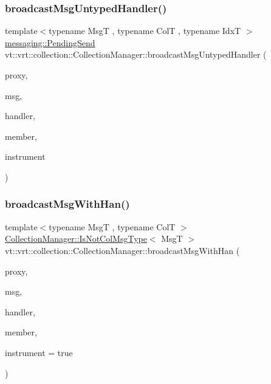 \subsubsection{\texorpdfstring{broadcast\+Msg\+Untyped\+Handler()}{broadcastMsgUntypedHandler()}}
{\footnotesize\ttfamily template$<$typename MsgT , typename ColT , typename IdxT $>$ \\
\hyperlink{structvt_1_1messaging_1_1_pending_send}{messaging\+::\+Pending\+Send} vt\+::vrt\+::collection\+::\+Collection\+Manager\+::broadcast\+Msg\+Untyped\+Handler (\begin{DoxyParamCaption}\item[{\hyperlink{structvt_1_1vrt_1_1collection_1_1_collection_manager_a56458ed7f9bb22b631b9b3a745f42f94}{Collection\+Proxy\+Wrap\+Type}$<$ ColT, IdxT $>$ const \&}]{proxy,  }\item[{MsgT $\ast$}]{msg,  }\item[{\hyperlink{namespacevt_af64846b57dfcaf104da3ef6967917573}{Handler\+Type} const \&}]{handler,  }\item[{bool const}]{member,  }\item[{bool}]{instrument }\end{DoxyParamCaption})}

\mbox{\label{structvt_1_1vrt_1_1collection_1_1_collection_manager_aa4f27486773ea5bec481099223ab12d1}} 
\subsubsection{\texorpdfstring{broadcast\+Msg\+With\+Han()}{broadcastMsgWithHan()}\hspace{0.1cm}{\footnotesize\ttfamily [1/2]}}
{\footnotesize\ttfamily template$<$typename MsgT , typename ColT $>$ \\
\hyperlink{structvt_1_1vrt_1_1collection_1_1_collection_manager_ae376deeefd4f89a0b1c93849977715d9}{Collection\+Manager\+::\+Is\+Not\+Col\+Msg\+Type}$<$ MsgT $>$ vt\+::vrt\+::collection\+::\+Collection\+Manager\+::broadcast\+Msg\+With\+Han (\begin{DoxyParamCaption}\item[{\hyperlink{structvt_1_1vrt_1_1collection_1_1_collection_manager_a56458ed7f9bb22b631b9b3a745f42f94}{Collection\+Proxy\+Wrap\+Type}$<$ ColT $>$ const \&}]{proxy,  }\item[{MsgT $\ast$}]{msg,  }\item[{\hyperlink{namespacevt_af64846b57dfcaf104da3ef6967917573}{Handler\+Type} const \&}]{handler,  }\item[{bool const}]{member,  }\item[{bool}]{instrument = {\ttfamily true} }\end{DoxyParamCaption})}

